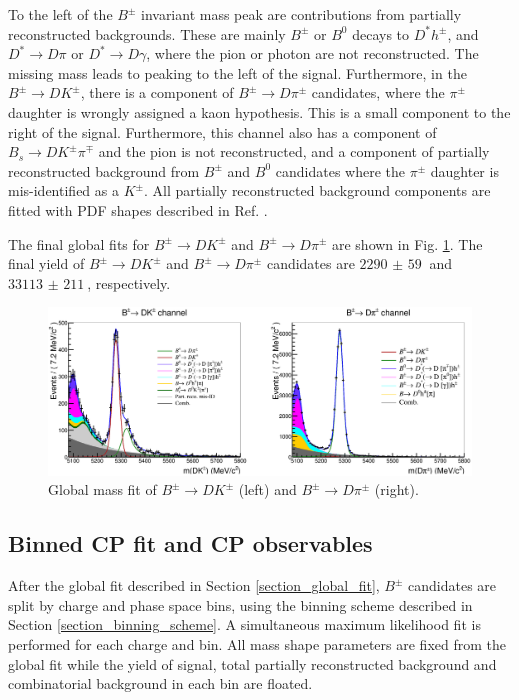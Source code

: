 \documentclass[12pt, a4paper, notitlepage, onecolumn]{article}
\numberwithin{equation}{section}
\begin{document}
To the left of the $B^\pm$ invariant mass peak are contributions from partially reconstructed backgrounds. These are mainly $B^\pm$ or $B^0$ decays to $D^*h^\pm$, and $D^*\to D\pi$ or $D^*\to D\gamma$, where the pion or photon are not reconstructed. The missing mass leads to peaking to the left of the signal. Furthermore, in the $B^\pm\to DK^\pm$, there is a component of $B^\pm\to D\pi^\pm$ candidates, where the $\pi^\pm$ daughter is wrongly assigned a kaon hypothesis. This is a small component to the right of the signal. Furthermore, this channel also has a component of $B_s\to DK^\pm\pi^\mp$ and the pion is not reconstructed, and a component of partially reconstructed background from $B^\pm$ and $B^0$ candidates where the $\pi^\pm$ daughter is mis-identified as a $K^\pm$. All partially reconstructed background components are fitted with PDF shapes described in Ref. \cite{cite_LHCbGGSZKSpipi}.

The final global fits for $B^\pm\to DK^\pm$ and $B^\pm\to D\pi^\pm$ are shown in Fig. \ref{fig_Bmass_Global}. The final yield of $B^\pm\to DK^\pm$ and $B^\pm\to D\pi^\pm$ candidates are $\SI{2290(59)}{}$ and $\SI{33113(211)}{}$, respectively.

\begin{figure}[H] 
  \centering
  \includegraphics[width=1\textwidth]{Plots/GlobalFit.png}
  \caption{Global mass fit of $B^\pm\to DK^\pm$ (left) and $B^\pm\to D\pi^\pm$ (right).}
  \label{fig_Bmass_Global}
\end{figure}

\subsection{Binned CP fit and CP observables}
\noindent After the global fit described in Section \ref{section_global_fit}, $B^\pm$ candidates are split by charge and phase space bins, using the binning scheme described in Section \ref{section_binning_scheme}. A simultaneous maximum likelihood fit is performed for each charge and bin. All mass shape parameters are fixed from the global fit while the yield of signal, total partially reconstructed background and combinatorial background in each bin are floated.
\end{document}
